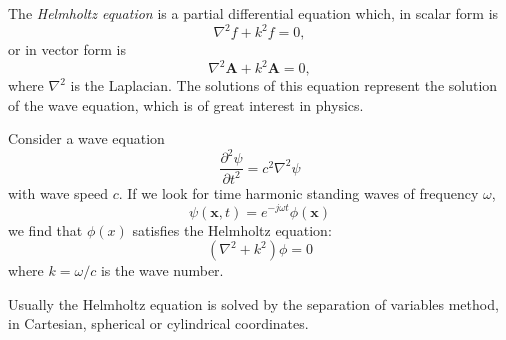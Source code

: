 \documentclass[12pt]{article}
\newcommand{\vA}{\mathbf{A}}
\newcommand{\vx}{\mathbf{x}}
\newcommand{\vnabla}{\nabla}
\begin{document}
The \emph{Helmholtz equation} is a partial differential equation which, in scalar form is $$\vnabla^2f+k^2f = 0,$$ or in vector form is $$\vnabla^2\vA+k^2\vA = 0,$$ where $\vnabla^2$ is the Laplacian.
The solutions of this equation represent the solution of the wave equation, which is of great interest in physics.

Consider a wave equation $$\frac{\partial^2\psi}{\partial t^2} = c^2\vnabla^2\psi$$
with wave speed $c$. If we look for time harmonic standing waves of frequency $\omega$,
$$\psi(\vx,t) = e^{-j\omega t}\phi(\vx)$$
we find that $\phi(x)$ satisfies the Helmholtz equation:
$$(\vnabla^2+k^2)\phi = 0$$
where $k=\omega/c$ is the wave number.

Usually the Helmholtz equation is solved by the separation of variables method, in Cartesian, spherical or cylindrical coordinates.
\end{document}
